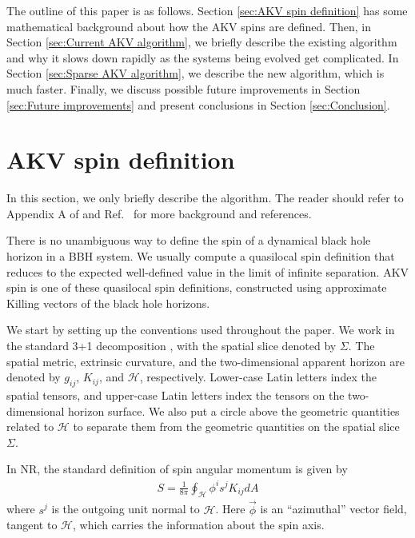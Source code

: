 \documentclass{iopjournal}
\begin{document}
The outline of this paper is as follows. Section \ref{sec:AKV spin definition} has some mathematical background about how the AKV spins are defined. Then, in Section \ref{sec:Current AKV algorithm}, we briefly describe the existing algorithm and why it slows down rapidly as the systems being evolved get complicated. In Section \ref{sec:Sparse AKV algorithm}, we describe the new algorithm, which is much faster. Finally, we discuss possible future improvements in Section \ref{sec:Future improvements} and present conclusions in Section \ref{sec:Conclusion}.

\section{\label{sec:AKV spin definition} AKV spin definition}
In this section, we only briefly describe the algorithm. The reader should refer to Appendix A of \cite{lovelace_binary-black-hole_2008} and Ref.~\cite{Owen:2017yaj} for more background and references.

There is no unambiguous way to define the spin of a dynamical black hole horizon in a BBH system. We usually compute a quasilocal spin definition that reduces to the expected well-defined value in the limit of infinite separation. AKV spin is one of these quasilocal spin definitions, constructed using approximate Killing vectors of the black hole horizons.

We start by setting up the conventions used throughout the paper. We
work in the standard 3+1 decomposition
\cite{NR_Baumgarte,NR_shibata,NR_Alcubierre}, with the spatial slice
denoted by $\Sigma$. The spatial metric, extrinsic curvature, and the
two-dimensional apparent horizon are denoted by $g_{ij}$, $K_{ij}$,
and $\mathcal{H}$, respectively. Lower-case Latin letters index the
spatial tensors, and upper-case Latin letters index the tensors on the
two-dimensional horizon surface. We also put a circle above the geometric quantities related to $\mathcal{H}$ to separate them from the geometric quantities on the
spatial slice $\Sigma$.

In NR, the standard definition \cite{lovelace08_73} of spin angular momentum is given by 
\begin{align}
S=\frac{1}{8 \pi} \oint_{\mathcal{H}} \phi^i s^j K_{i j} d A
\label{eqn:spin angular momentum}
\end{align}
where  $s^j$ is the outgoing unit normal to $\mathcal{H}$. Here $\vec{\phi}$ is an ``azimuthal'' vector field, tangent to $\mathcal{H}$, which carries the information about the spin axis.
\end{document}

